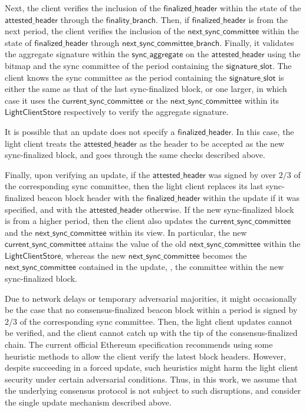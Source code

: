 Next, the client verifies the inclusion of the $\mathsf{finalized\_header}$ within the state 
of the $\mathsf{attested\_header}$ through the $\mathsf{finality\_branch}$.
Then, if $\mathsf{finalized\_header}$ is from the next period, the client verifies the inclusion of the
$\mathsf{next\_sync\_committee}$ within the state of $\mathsf{finalized\_header}$ through $\mathsf{next\_sync\_committee\_branch}$.
Finally, it validates the aggregate signature within the $\mathsf{sync\_aggregate}$ on the $\mathsf{attested\_header}$ 
using the bitmap and the sync committee of the period containing the $\mathsf{signature\_slot}$.
The client knows the sync committee as the period containing the $\mathsf{signature\_slot}$ is either the same as 
that of the last sync-finalized block, or one larger, in which case it uses the $\mathsf{current\_sync\_committee}$ or 
the $\mathsf{next\_sync\_committee}$ within its $\mathsf{LightClientStore}$ respectively to verify the aggregate signature.

It is possible that an update does not specify a $\mathsf{finalized\_header}$. 
In this case, the light client treats the $\mathsf{attested\_header}$ as the header to be accepted 
as the new sync-finalized block, and goes through the same checks described above.

Finally, upon verifying an update, if the $\mathsf{attested\_header}$
was signed by over $2/3$ of the corresponding sync committee, then the light client replaces
its last sync-finalized beacon block header with the $\mathsf{finalized\_header}$ within the update if it
was specified, and with the $\mathsf{attested\_header}$ otherwise.
If the new sync-finalized block is from a higher period, then the client also updates 
the $\mathsf{current\_sync\_committee}$ and the $\mathsf{next\_sync\_committee}$ within its view.
In particular, the new $\mathsf{current\_sync\_committee}$ attains the value of the old $\mathsf{next\_sync\_committee}$ 
within the $\mathsf{LightClientStore}$, whereas the new $\mathsf{next\_sync\_committee}$ becomes 
the $\mathsf{next\_sync\_committee}$ contained in the update, \ie, the committee within the new sync-finalized block.

Due to network delays or temporary adversarial majorities, it might occasionally be the case that
no consensus-finalized beacon block within a period is signed by $2/3$ of the corresponding sync committee. 
Then, the light client updates cannot be verified, and the client cannot catch up with the tip of the consensus-finalized chain.
The current official Ethereum specification recommends using some heuristic methods to allow the client verify
the latest block headers.
However, despite succeeding in a forced update, such heuristics might harm the light client security
under certain adversarial conditions.
Thus, in this work, we assume that the underlying consensus protocol is not subject to such disruptions, 
and consider the single update mechanism described above.

